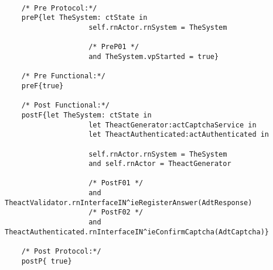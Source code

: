 	\scriptsize
	\vspace{0.5cm}
	\begin{lstlisting}[style=MessirStyle,firstnumber=auto,captionpos=b,caption={\msrmessir (MCL-oriented) specification of the operation \emph{oeSendCaptcha}.},label=OM-actCaptchaService-oeSendCaptcha-MCL-LST]

	/* Pre Protocol:*/ 
	preP{let TheSystem: ctState in
					self.rnActor.rnSystem = TheSystem
	  
					/* PreP01 */
					and TheSystem.vpStarted = true}
	
	/* Pre Functional:*/
	preF{true}
	
	/* Post Functional:*/ 
	postF{let TheSystem: ctState in
					let TheactGenerator:actCaptchaService in
					let TheactAuthenticated:actAuthenticated in
					
					self.rnActor.rnSystem = TheSystem
					and self.rnActor = TheactGenerator
					
					/* PostF01 */
					and TheactValidator.rnInterfaceIN^ieRegisterAnswer(AdtResponse)
					/* PostF02 */
					and TheactAuthenticated.rnInterfaceIN^ieConfirmCaptcha(AdtCaptcha)}
	
	/* Post Protocol:*/ 
	postP{ true}
	
	\end{lstlisting}
	\normalsize 
	
	
	
	






